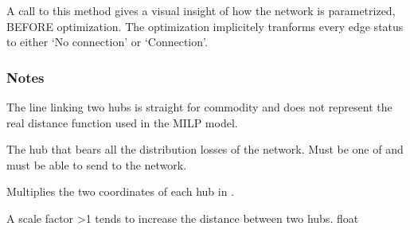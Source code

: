 \documentclass[letterpaper,10pt,english]{sphinxmanual}
\begin{document}
\begin{fulllineitems}
\begin{fulllineitems}
\sphinxAtStartPar
A call to this method gives a visual insight of how the network is parametrized, BEFORE optimization.
The optimization implicitely tranforms every edge status to either ‘No connection’ or ‘Connection’.
\subsubsection*{Notes}

\sphinxAtStartPar
The line linking two hubs is straight for commodity and does not represent
the real distance function used in the MILP model.

\end{fulllineitems}


\begin{fulllineitems}
\label{\detokenize{generated/tamos.network.NonThermalNetwork:tamos.network.NonThermalNetwork.production_hub}}
\pysigstartsignatures
{}
\pysigstopsignatures
\sphinxAtStartPar
The hub that bears all the distribution losses of the network.
Must be one of  and must be able to send  to the network.

\end{fulllineitems}


\begin{fulllineitems}
\label{\detokenize{generated/tamos.network.NonThermalNetwork:tamos.network.NonThermalNetwork.scale_factor}}
\pysigstartsignatures
{}
\pysigstopsignatures
\sphinxAtStartPar
Multiplies the two coordinates of each hub in .

\sphinxAtStartPar
A scale factor \textgreater{}1 tends to increase the distance between two hubs.
float

\end{fulllineitems}



\end{fulllineitems}
\end{document}
